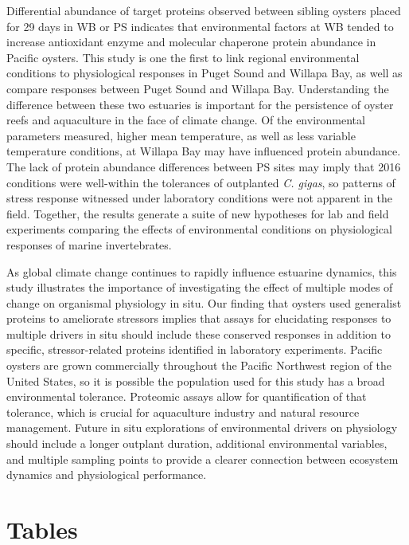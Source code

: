 \documentclass [11pt, proquest] {uwthesis}[2015/03/03]
\begin{document}
Differential abundance of target proteins observed between sibling oysters placed for 29 days in WB or PS indicates that environmental factors at WB tended to increase antioxidant enzyme and molecular chaperone protein abundance in Pacific oysters. This study is one the first to link regional environmental conditions to physiological responses in Puget Sound and Willapa Bay, as well as compare responses between Puget Sound and Willapa Bay. Understanding the difference between these two estuaries is important for the persistence of oyster reefs and aquaculture in the face of climate change. Of the environmental parameters measured, higher mean temperature, as well as less variable temperature conditions, at Willapa Bay may have influenced protein abundance. The lack of protein abundance differences between PS sites may imply that 2016 conditions were well-within the tolerances of outplanted \emph{C. gigas}, so patterns of stress response witnessed under laboratory conditions were not apparent in the field. Together, the results generate a suite of new hypotheses for lab and field experiments comparing the effects of environmental conditions on physiological responses of marine invertebrates.

As global climate change continues to rapidly influence estuarine dynamics, this study illustrates the importance of investigating the effect of multiple modes of change on organismal physiology in situ. Our finding that oysters used generalist proteins to ameliorate stressors implies that assays for elucidating responses to multiple drivers in situ should include these conserved responses in addition to specific, stressor-related proteins identified in laboratory experiments. Pacific oysters are grown commercially throughout the Pacific Northwest region of the United States, so it is possible the population used for this study has a broad environmental tolerance. Proteomic assays allow for quantification of that tolerance, which is crucial for aquaculture industry and natural resource management. Future in situ explorations of environmental drivers on physiology should include a longer outplant duration, additional environmental variables, and multiple sampling points to provide a clearer connection between ecosystem dynamics and physiological performance.

\hypertarget{tables}{%
\section{Tables}\label{tables}}
\end{document}

